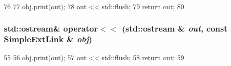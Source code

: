 \begin{DoxyCode}
76 {
77     obj.print(out);
78     out << std::flush;
79     return out;
80 }
\end{DoxyCode}
\hypertarget{SimpleLink_8hh_a24b2778c8eb71990d0e08b365a4f9897}{
\subsubsection[{operator$<$$<$}]{\setlength{\rightskip}{0pt plus 5cm}std::ostream\& operator$<$$<$ (std::ostream \& {\em out}, \/  const {\bf SimpleExtLink} \& {\em obj})}}
\label{SimpleLink_8hh_a24b2778c8eb71990d0e08b365a4f9897}



\begin{DoxyCode}
55 {
56     obj.print(out);
57     out << std::flush;
58     return out;
59 }
\end{DoxyCode}
